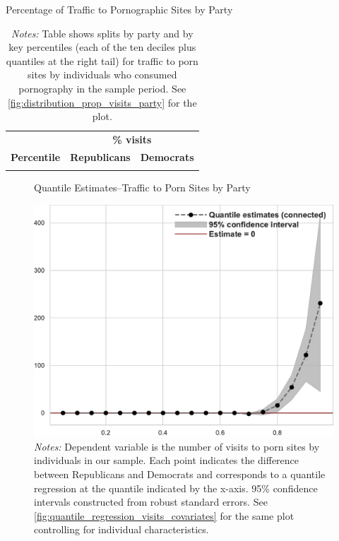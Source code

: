 \documentclass[12pt, letterpaper]{article}
\begin{document}
\begin{table} \centering \small \setlength\tabcolsep{10 pt}
	\caption{Percentage of Traffic to Pornographic Sites by Party}
	\label{tab:distribution_prop_visits_party}
	\begin{adjustbox}{max width=\textwidth}
		\begin{tabular}{@{\hspace{0\tabcolsep}}ccc@{\hspace{0\tabcolsep}}}
			\toprule
			\multicolumn{1}{l}{\textbf{}}&\multicolumn{2}{c}{\textbf{\% visits}}\\
			\cmidrule(l){2-3}
			\multicolumn{1}{l}{\textbf{Percentile}}&\multicolumn{1}{c}{\textbf{Republicans}}&\multicolumn{1}{c}{\textbf{Democrats}}\\	
			\midrule
			\\
			\bottomrule
		\end{tabular}
	\end{adjustbox}
	\caption*{\footnotesize \emph{Notes:} 
		Table shows splits by party and by key percentiles (each of the ten deciles plus quantiles at the right tail) for traffic to porn sites by individuals who consumed pornography in the sample period. See \cref{fig:distribution_prop_visits_party} for the plot.
	}
\end{table}


\begin{figure}
	\centering
	\caption{Quantile Estimates--Traffic to Porn Sites by Party}
	\includegraphics[width=.6\linewidth]{../figs/quantile_reg_visits_adult.pdf}
	\caption*{\footnotesize \emph{Notes:} 
		Dependent variable is the number of visits to porn sites by individuals in our sample.
		Each point indicates the difference between Republicans and Democrats and corresponds to a quantile regression at the quantile indicated by the x-axis.
		95\% confidence intervals constructed from robust standard errors.
		See \cref{fig:quantile_regression_visits_covariates} for the same plot controlling for individual characteristics.
	}
	\label{fig:quantile_regression_visits}
\end{figure}
\end{document}
